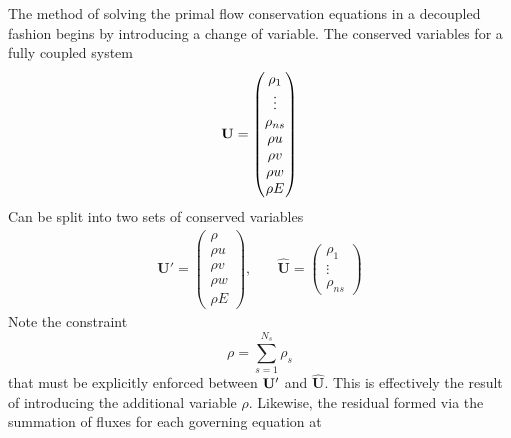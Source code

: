 \documentclass{article}   	%
\begin{document}
The method of solving the primal flow conservation equations in a decoupled
fashion begins by introducing a change of variable.  The conserved variables for
a fully coupled system
\begin{equation}
	\mathbf U =
  \begin{pmatrix}
 		\rho_1    \\
		\vdots    \\
		\rho_{ns} \\
		\rho u    \\
		\rho v    \\
		\rho w    \\
		\rho E    \\
	\end{pmatrix}
  \label{fully-coupled-vars}
 \end{equation}
Can be split into two sets of conserved variables
\begin{equation}
	\begin{matrix}
		\mathbf{U}'=\begin{pmatrix}
			\rho \\
			\rho u \\
			\rho v \\
			\rho w \\
			\rho E
		\end{pmatrix},\quad &
		\mathbf{\hat{U}}=\begin{pmatrix}
			\rho_1 \\
			\vdots \\
			\rho_{ns}
		\end{pmatrix}
	\end{matrix}
  \label{decoupled-variables}
\end{equation}
Note the constraint
\begin{equation}
  \rho = \sum_{s=1}^{N_s}\rho_s
  \label{rho-constraint}
\end{equation}
that must be explicitly enforced between $\mathbf U'$ and $\mathbf{\hat{U}}$.  This is
effectively the result of introducing the additional variable $\rho$.  Likewise,
the residual formed via the summation of fluxes for each governing equation at
\end{document}

